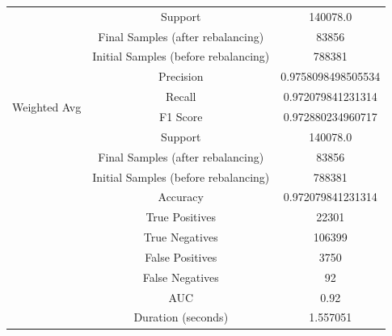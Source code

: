 \begin{longtable}{|c|c|c|}
 & Support & 140078.0 \\
 & Final Samples (after rebalancing) & 83856 \\
 & Initial Samples (before rebalancing) & 788381 \\
\hline
\multirow{4}{*}{Weighted Avg} & Precision & 0.9758098498505534 \\
 & Recall & 0.972079841231314 \\
 & F1 Score & 0.972880234960717 \\
 & Support & 140078.0 \\
 & Final Samples (after rebalancing) & 83856 \\
 & Initial Samples (before rebalancing) & 788381 \\
\hline
& Accuracy & 0.972079841231314 \\ \hline
& True Positives & 22301 \\ \hline
& True Negatives & 106399 \\ \hline
& False Positives & 3750 \\ \hline
& False Negatives & 92 \\ \hline
& AUC & 0.92 \\ \hline
& Duration (seconds) & 1.557051 \\ \hline
\end{longtable}



